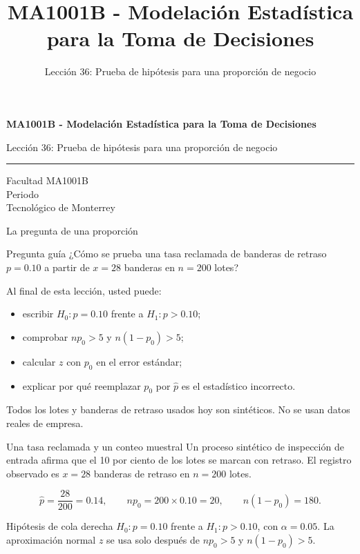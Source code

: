 \documentclass[aspectratio=169,10pt,spanish]{beamer}
\title{MA1001B - Modelación Estadística para la Toma de Decisiones}
\subtitle{Lección 36: Prueba de hipótesis para una proporción de negocio}
\author{}
\institute{Tecnol\'ogico de Monterrey}
\date{}
\begin{document}
\begin{frame}[plain]
  \vspace{1.2cm}
  {\Large\bfseries MA1001B - Modelación Estadística para la Toma de Decisiones\par}
  \vspace{0.7cm}
  {\large Lección 36: Prueba de hipótesis para una proporción de negocio\par}
  \vspace{0.7cm}
  {\color{TecRojo}\rule{\textwidth}{1.2pt}}
  \vspace{0.8cm}

  Facultad MA1001B\\[0.3cm]
  Periodo\\[0.3cm]
  Tecnol\'ogico de Monterrey
\end{frame}

\begin{frame}{La pregunta de una proporción}
  \begin{alertblock}{Pregunta guía}
    ¿Cómo se prueba una tasa reclamada de banderas de retraso $p=0.10$ a
    partir de $x=28$ banderas en $n=200$ lotes?
  \end{alertblock}

  \vspace{0.6em}
  Al final de esta lección, usted puede:
  \begin{itemize}
    \item escribir $H_0:p=0.10$ frente a $H_1:p>0.10$;
    \item comprobar $np_0>5$ y $n(1-p_0)>5$;
    \item calcular $z$ con $p_0$ en el error estándar;
    \item explicar por qué reemplazar $p_0$ por $\hat{p}$ es el estadístico
      incorrecto.
  \end{itemize}

  \vfill
  \scriptsize Todos los lotes y banderas de retraso usados hoy son sintéticos. No se usan datos reales de empresa.
\end{frame}

\begin{frame}{Una tasa reclamada y un conteo muestral}
  \small
  Un proceso sintético de inspección de entrada afirma que el 10 por ciento
  de los lotes se marcan con retraso. El registro observado es $x=28$
  banderas de retraso en $n=200$ lotes.

  \[
    \hat{p}=\frac{28}{200}=0.14,\qquad
    np_0=200\times0.10=20,\qquad
    n(1-p_0)=180.
  \]

  \begin{exampleblock}{Hipótesis de cola derecha}
    $H_0:p=0.10$ frente a $H_1:p>0.10$, con $\alpha=0.05$. La aproximación
    normal $z$ se usa solo después de $np_0>5$ y $n(1-p_0)>5$.
  \end{exampleblock}
\end{frame}
\end{document}
